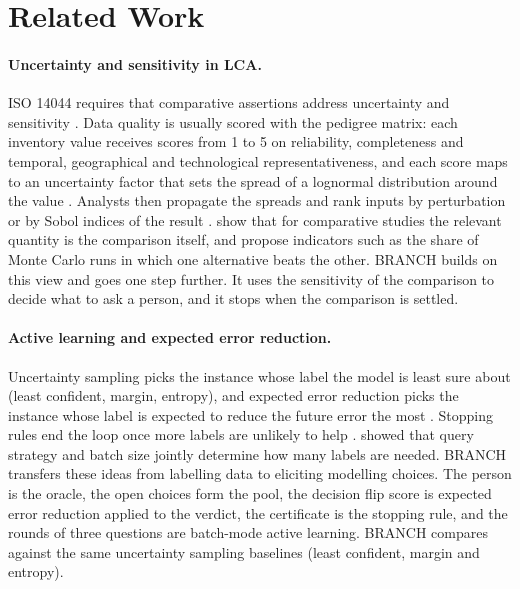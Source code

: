 \documentclass{article}
\begin{document}
\section{Related Work}\label{sec:related}

\paragraph{Uncertainty and sensitivity in LCA.}
ISO 14044 requires that comparative assertions address uncertainty and sensitivity \citep{iso14044}.
Data quality is usually scored with the pedigree matrix: each inventory value receives scores from 1 to 5
on reliability, completeness and temporal, geographical and technological representativeness, and each
score maps to an uncertainty factor that sets the spread of a lognormal distribution around the value
\citep{weidema2013}. Analysts then propagate the spreads and rank inputs by
perturbation or by Sobol indices of the result \citep{heijungs2001,sobol2001,saltelli2008,groen2017,igos2019}. \citet{mendoza2018} show that for comparative studies
the relevant quantity is the comparison itself, and propose indicators such as the share of Monte Carlo
runs in which one alternative beats the other. BRANCH builds on this view and goes one step further.
It uses the sensitivity of the comparison to decide what to ask a person, and it stops when the comparison
is settled.

\paragraph{Active learning and expected error reduction.}
Uncertainty sampling picks the instance whose label the model is least sure about (least confident,
margin, entropy), and expected error reduction picks the instance whose label is expected to reduce the
future error the most \citep{settles2009,roy2001}. Stopping rules end the loop once more labels are
unlikely to help \citep{vlachos2008}. \citet{faria2022} showed that query strategy and batch size jointly
determine how many labels are needed. BRANCH transfers these ideas from labelling data to eliciting
modelling choices. The person is the oracle, the open choices form the pool, the decision flip score is
expected error reduction applied to the verdict, the certificate is the stopping rule, and the rounds of
three questions are batch-mode active learning. BRANCH compares against the same uncertainty sampling
baselines (least confident, margin and entropy).
\end{document}
